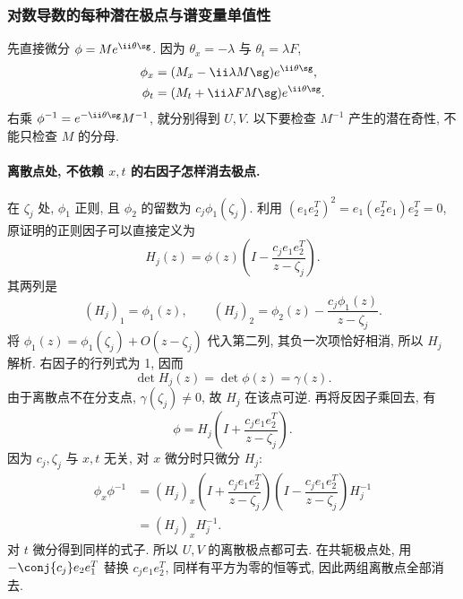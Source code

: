 \subsubsection*{对数导数的每种潜在极点与谱变量单值性}
先直接微分 $\phi=Me^{\ii\theta\sg}$.
因为 $\theta_x=-\lambda$ 与 $\theta_t=\lambda F$,
\[
\begin{aligned}
\phi_x
&=(M_x-\ii\lambda M\sg)e^{\ii\theta\sg},\\
\phi_t
&=(M_t+\ii\lambda F M\sg)e^{\ii\theta\sg}.
\end{aligned}
\]
右乘 $\phi^{-1}=e^{-\ii\theta\sg}M^{-1}$,
就分别得到 $ U, V$.
以下要检查 $M^{-1}$ 产生的潜在奇性, 不能只检查 $M$ 的分母.

\paragraph{离散点处, 不依赖 $x,t$ 的右因子怎样消去极点.}
在 $\zeta_j$ 处, $\phi_1$ 正则,
且 $\phi_2$ 的留数为 $c_j\phi_1(\zeta_j)$.
利用 $(e_1e_2^T)^2=e_1(e_2^Te_1)e_2^T=0$,
原证明的正则因子可以直接定义为
\[
 H_j(z)
=\phi(z)\left(I-\dfrac{c_je_1e_2^T}{z-\zeta_j}\right).
\]
其两列是
\[
( H_j)_1=\phi_1(z),\qquad
( H_j)_2=\phi_2(z)-\dfrac{c_j\phi_1(z)}{z-\zeta_j}.
\]
将 $\phi_1(z)=\phi_1(\zeta_j)+O(z-\zeta_j)$ 代入第二列,
其负一次项恰好相消, 所以 $ H_j$ 解析.
右因子的行列式为 1, 因而
\[
\det H_j(z)=\det\phi(z)=\gamma(z).
\]
由于离散点不在分支点, $\gamma(\zeta_j)\ne0$,
故 $ H_j$ 在该点可逆.
再将反因子乘回去, 有
\[
\phi= H_j
\left(I+\dfrac{c_je_1e_2^T}{z-\zeta_j}\right).
\]
因为 $c_j,\zeta_j$ 与 $x,t$ 无关, 对 $x$ 微分时只微分 $ H_j$:
\[
\begin{aligned}
\phi_x\phi^{-1}
&=( H_j)_x
\left(I+\dfrac{c_je_1e_2^T}{z-\zeta_j}\right)
\left(I-\dfrac{c_je_1e_2^T}{z-\zeta_j}\right)
 H_j^{-1}\\
&=( H_j)_x H_j^{-1}.
\end{aligned}
\]
对 $t$ 微分得到同样的式子.
所以 $ U, V$ 的离散极点都可去.
在共轭极点处, 用 $-\conj{c_j}e_2e_1^T$ 替换
$c_je_1e_2^T$, 同样有平方为零的恒等式,
因此两组离散点全部消去.

